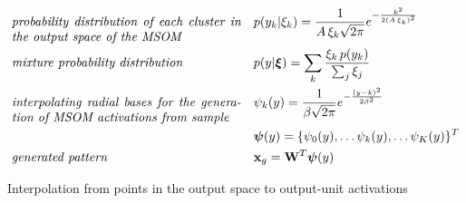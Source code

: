\documentclass[a4paper]{article}
\begin{document}
\begin{align}
	& \emph{\parbox[t]{2.5in}{probability distribution of 
    each cluster in the output space of the MSOM}} && 
    p(y_k|\xi_k) = \frac{1}{A\,\xi_k\sqrt{2\pi}} 
    e^{-\frac{k^2}{2(A\,\xi_k)^2}}\nonumber\\
    & \emph{mixture probability distribution} && 
    p(y|\boldsymbol{\xi}) = \sum_k \frac{\xi_k\, p(y_k)}
    {\sum_j\xi_j}\nonumber\\
    & \emph{\parbox[t]{2.5in}{interpolating radial bases
    for the generation of MSOM activations from sample}} && 
    \psi_k(y) = \frac{1}{\beta\sqrt{2\pi}}
    e^{-\frac{(y-k)^2}{2\beta^2}}\nonumber\\
    & &&\boldsymbol{\psi}(y) = \{\psi_0(y),\dots\psi_k(y), 
    \dots\psi_K(y)\}^T \nonumber\\
    & \emph{generated pattern} &&
    \mathbf{x}_g = \mathbf{W}^T\boldsymbol{\psi}(y)\nonumber     
\end{align}

\IncMargin{1em}
\begin{algorithm}[H]
\DontPrintSemicolon
{}



\BlankLine

\BlankLine


\caption{Interpolation from points in the output space to output-unit activations}\label{interp}

\end{algorithm}
\DecMargin{1em}
\end{document}

